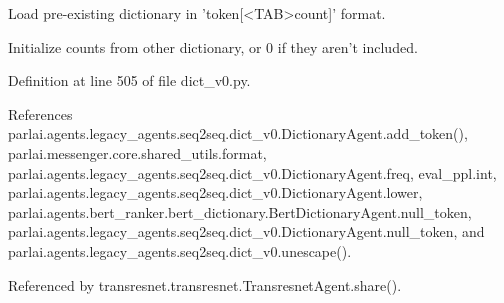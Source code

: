 \begin{DoxyVerb}Load pre-existing dictionary in 'token[<TAB>count]' format.

Initialize counts from other dictionary, or 0 if they aren't included.
\end{DoxyVerb}
 

Definition at line 505 of file dict\+\_\+v0.\+py.



References parlai.\+agents.\+legacy\+\_\+agents.\+seq2seq.\+dict\+\_\+v0.\+Dictionary\+Agent.\+add\+\_\+token(), parlai.\+messenger.\+core.\+shared\+\_\+utils.\+format, parlai.\+agents.\+legacy\+\_\+agents.\+seq2seq.\+dict\+\_\+v0.\+Dictionary\+Agent.\+freq, eval\+\_\+ppl.\+int, parlai.\+agents.\+legacy\+\_\+agents.\+seq2seq.\+dict\+\_\+v0.\+Dictionary\+Agent.\+lower, parlai.\+agents.\+bert\+\_\+ranker.\+bert\+\_\+dictionary.\+Bert\+Dictionary\+Agent.\+null\+\_\+token, parlai.\+agents.\+legacy\+\_\+agents.\+seq2seq.\+dict\+\_\+v0.\+Dictionary\+Agent.\+null\+\_\+token, and parlai.\+agents.\+legacy\+\_\+agents.\+seq2seq.\+dict\+\_\+v0.\+unescape().



Referenced by transresnet.\+transresnet.\+Transresnet\+Agent.\+share().

